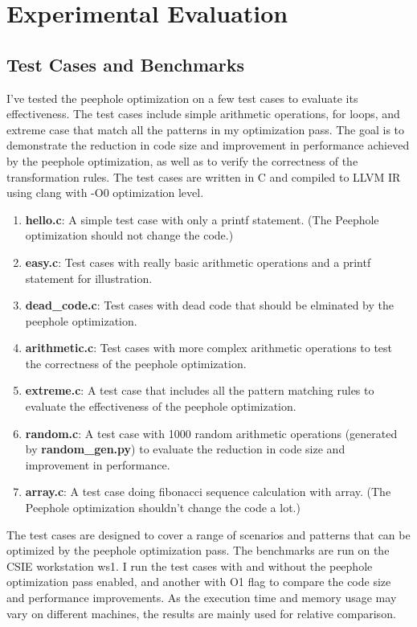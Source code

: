 \documentclass[conference]{IEEEtran}
\begin{document}
\section{Experimental Evaluation}

\subsection{Test Cases and Benchmarks}
I've tested the peephole optimization on a few test cases to evaluate its effectiveness. The test cases include simple arithmetic operations, for loops, and extreme case that match all the patterns in my optimization pass. The goal is to demonstrate the reduction in code size and improvement in performance achieved by the peephole optimization, as well as to verify the correctness of the transformation rules. The test cases are written in C and compiled to LLVM IR using clang with -O0 optimization level.

\begin{enumerate}
	\item \textbf{hello.c}: A simple test case with only a printf statement. (The Peephole optimization should not change the code.)
	\item \textbf{easy.c}: Test cases with really basic arithmetic operations and a printf statement for illustration.
	\item \textbf{dead\_code.c}: Test cases with dead code that should be elminated by the peephole optimization.
	\item \textbf{arithmetic.c}: Test cases with more complex arithmetic operations to test the correctness of the peephole optimization.
	\item \textbf{extreme.c}: A test case that includes all the pattern matching rules to evaluate the effectiveness of the peephole optimization.
	\item \textbf{random.c}: A test case with 1000 random arithmetic operations (generated by \textbf{random\_gen.py}) to evaluate the reduction in code size and improvement in performance.
	\item \textbf{array.c}: A test case doing fibonacci sequence calculation with array. (The Peephole optimization shouldn't change the code a lot.)
\end{enumerate}

The test cases are designed to cover a range of scenarios and patterns that can be optimized by the peephole optimization pass. The benchmarks are run on the CSIE workstation ws1. I run the test cases with and without the peephole optimization pass enabled, and another with O1 flag to compare the code size and performance improvements. As the execution time and memory usage may vary on different machines, the results are mainly used for relative comparison.
\end{document}
